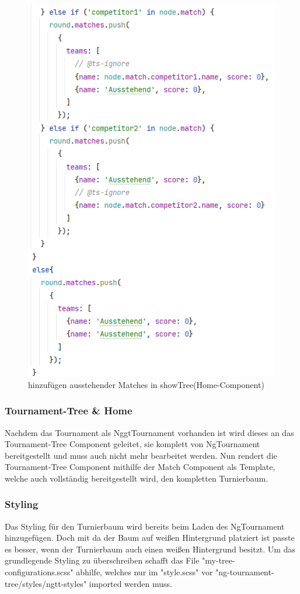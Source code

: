 \begin{figure}[H]
    \includegraphics[scale=0.7]{pics/frontend/ausstehende_matches.PNG}
    \caption{hinzufügen ausstehender Matches in showTree(Home-Component)}
\end{figure}

\subsubsection{Tournament-Tree \& Home}
Nachdem das Tournament als NggtTournament vorhanden ist wird dieses an das Tournament-Tree Component geleitet, sie komplett von NgTournament bereitgestellt und muss auch nicht mehr bearbeitet werden. 
Nun rendert die Tournament-Tree Component mithilfe der Match Component als Template, welche auch vollständig bereitgestellt wird, den kompletten Turnierbaum.

\subsubsection{Styling}
Das Styling für den Turnierbaum wird bereits beim Laden des NgTournament hinzugefügen. Doch mit da der Baum auf weißen Hintergrund platziert ist passte es besser, wenn der Turnierbaum auch einen weißen Hintergrund besitzt.
Um das grundlegende Styling zu überschreiben schafft das File "my-tree-configurations.scss" abhilfe, welches nur im "style.scss" vor "ng-tournament-tree/styles/ngtt-styles" imported werden muss.

